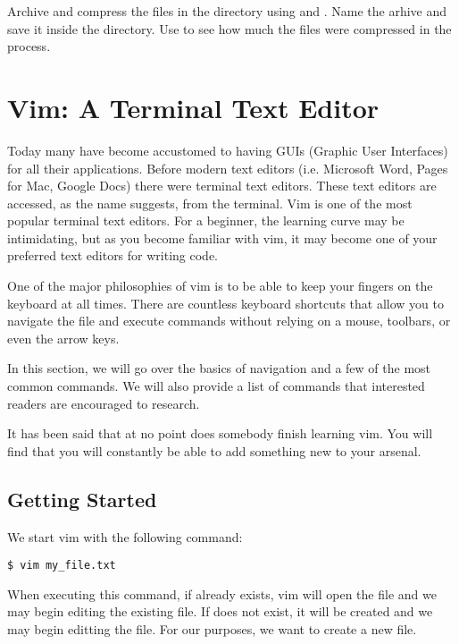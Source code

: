 \begin{problem}
Archive and compress the files in the  directory using  and . Name the arhive  and save it inside the  directory. Use  to see how much the files were compressed in the process.
\end{problem}

\section*{Vim: A Terminal Text Editor}
Today many have become accustomed to having GUIs (Graphic User Interfaces) for all their applications. Before modern text editors (i.e. Microsoft Word, Pages for Mac, Google Docs) there were terminal text editors. 
These text editors are accessed, as the name suggests, from the terminal. Vim is one of the most popular terminal text editors. For a beginner, the learning curve may be intimidating, but as you become familiar with vim, it may become one of your preferred text editors for writing code.

One of the major philosophies of vim is to be able to keep your fingers on the keyboard at all times. There are countless keyboard shortcuts that allow you to navigate the file and execute commands without relying on a mouse, toolbars, or even the arrow keys.

In this section, we will go over the basics of navigation and a few of the most common commands. We will also provide a list of commands that interested readers are encouraged to research. 

It has been said that at no point does somebody finish learning vim. You will find that you will constantly be able to add something new to your arsenal.

\subsection*{Getting Started}
We start vim with the following command:

\begin{lstlisting}
$ vim my_file.txt
\end{lstlisting}

When executing this command, if  already exists, vim will open the file and we may begin editing the existing file. If  does not exist, it will be created and we may begin editting the file. For our purposes, we want to create a new file.

